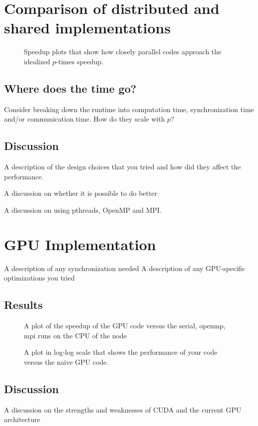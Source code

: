 \documentclass[12pt]{article}
\begin{document}
\section{Comparison of distributed and shared implementations}

\begin{figure}
  \caption{Speedup plots that show how closely parallel codes approach the idealized $p$-times speedup.}
  \label{fig:speedup}
\end{figure}

\subsection{Where does the time go?}
Consider breaking down the runtime into computation time, synchronization time and/or communication time. How do they scale with $p$?

\subsection{Discussion}

A description of the design choices that you tried and how did they affect the performance.

A discussion on whether it is possible to do better

A discussion on using pthreads, OpenMP and MPI.

\section{GPU Implementation} \label{GPU}

A description of any synchronization needed
A description of any GPU-specific optimizations you tried

\subsection{Results}

\begin{figure}
  \caption{A plot of the speedup of the GPU code versus the serial, openmp, mpi runs on the CPU of the node}
  \label{fig:gpu-speedup}
\end{figure}

\begin{figure}
  \caption{A plot in log-log scale that shows the performance of your code versus the naive GPU code.}
  \label{fig:gpu-naive}
\end{figure}

\subsection{Discussion}

A discussion on the strengths and weaknesses of CUDA and the current GPU architecture


%
\end{document}
